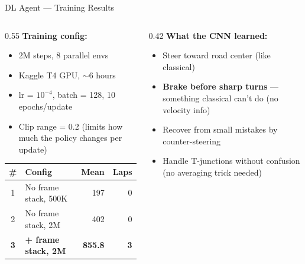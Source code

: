\documentclass[aspectratio=169, 12pt]{beamer}
\begin{document}
\begin{frame}{DL Agent --- Training Results}
\begin{columns}[T]
\begin{column}{0.55\textwidth}
\textbf{Training config:}
\begin{itemize}\setlength\itemsep{0.2em}
    \item 2M steps, 8 parallel envs
    \item Kaggle T4 GPU, $\sim$6 hours
    \item lr = $10^{-4}$, batch = 128, 10 epochs/update
    \item Clip range = 0.2 (limits how much the policy changes per update)
\end{itemize}

\vspace{0.5em}
{\small
\begin{tabular}{clrr}
\toprule
\# & Config & Mean & Laps \\
\midrule
1 & No frame stack, 500K & 197 & 0 \\
2 & No frame stack, 2M & 402 & 0 \\
\textbf{3} & \textbf{+ frame stack, 2M} & \textbf{855.8} & \textbf{3} \\
\bottomrule
\end{tabular}
}
\end{column}
\begin{column}{0.42\textwidth}
\vspace{1em}
\textbf{What the CNN learned:}
\begin{itemize}\setlength\itemsep{0.3em}
    \item Steer toward road center (like classical)
    \item \textbf{Brake before sharp turns} --- something classical can't do (no velocity info)
    \item Recover from small mistakes by counter-steering
    \item Handle T-junctions without confusion (no averaging trick needed)
\end{itemize}
\end{column}
\end{columns}
\end{frame}
\end{document}
